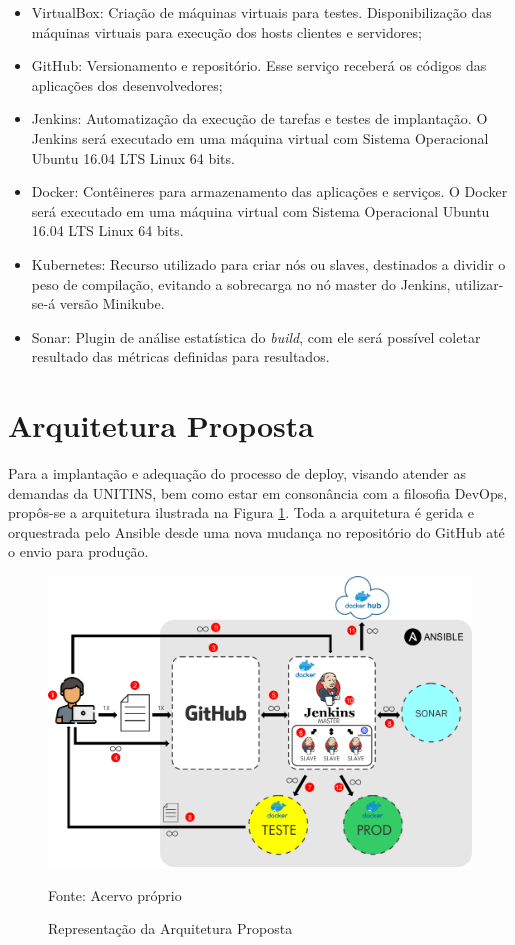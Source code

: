 \begin{itemize}
	    \vspace*{0.5cm}
	
\item VirtualBox: Criação de máquinas virtuais para testes. Disponibilização das máquinas virtuais para execução dos hosts clientes e servidores;
\item GitHub: Versionamento e repositório. Esse serviço receberá os códigos das aplicações dos desenvolvedores;
\item Jenkins: Automatização da execução de tarefas e testes de implantação. O Jenkins será executado em uma máquina virtual com Sistema Operacional Ubuntu 16.04 LTS Linux 64 bits.
\item Docker: Contêineres para armazenamento das aplicações e serviços. O Docker será executado em uma máquina virtual com Sistema Operacional Ubuntu 16.04 LTS Linux 64 bits.
\item Kubernetes: Recurso utilizado para criar nós ou slaves, destinados a dividir o peso de compilação, evitando a sobrecarga no nó master do Jenkins, utilizar-se-á versão Minikube.
\item Sonar: Plugin de análise estatística do \textit{build}, com ele será possível coletar resultado das métricas definidas para resultados.

\end{itemize}

    \vspace*{0.5cm}

\section{Arquitetura Proposta}

Para a implantação e adequação do processo de deploy, visando atender as demandas da UNITINS, bem como estar em consonância com a filosofia DevOps, propôs-se a arquitetura ilustrada na Figura \ref{fig:pipelinejenkins}.
Toda a arquitetura é gerida e orquestrada pelo Ansible desde uma nova mudança no repositório do GitHub até o envio para produção.
\\
\begin{figure}
	\centering
	\includegraphics[width=1\linewidth]{imagens/pipelinejenkins}
	\caption{Representação da Arquitetura Proposta}
Fonte: Acervo próprio
\label{fig:pipelinejenkins}
\end{figure}


